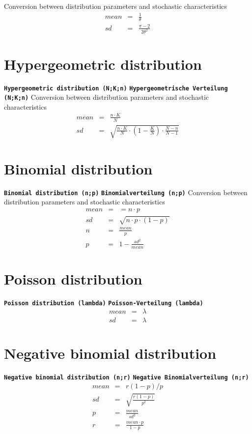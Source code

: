\documentclass{svmono}
\def\cm#1{\textbf{\texttt{#1}}}
\begin{document}
Conversion between distribution parameters and stochastic characteristics
\begin{eqnarray*}
mean&=&\frac{1}{\theta}\\
sd&=&\frac{\pi-2}{2\theta^2}
\end{eqnarray*}





\section*{Hypergeometric distribution}
\cm{Hypergeometric distribution (N;K;n)}
\cm{Hypergeometrische Verteilung (N;K;n)}
Conversion between distribution parameters and stochastic characteristics
\begin{eqnarray*}
mean&=&\frac{n\cdot K}{N}\\
sd&=&\sqrt{\frac{n\cdot K}{N}\cdot\left(1-\frac{K}{N}\right)\cdot\frac{N-n}{N-1}}
\end{eqnarray*}





\section*{Binomial distribution}
\cm{Binomial distribution (n;p)}
\cm{Binomialverteilung (n;p)}
Conversion between distribution parameters and stochastic characteristics
\begin{eqnarray*}
mean&=&=n\cdot p\\
sd&=&\sqrt{n\cdot p\cdot (1-p)}\\
n&=&\frac{mean}{p}\\
p&=&1-\frac{sd^2}{mean}
\end{eqnarray*}





\section*{Poisson distribution}
\cm{Poisson distribution (lambda)}
\cm{Poisson-Verteilung (lambda)}
\begin{eqnarray*}
mean&=&\lambda\\
sd&=&\lambda
\end{eqnarray*}





\section*{Negative binomial distribution}
\cm{Negative binomial distribution (n;r)}
\cm{Negative Binomialverteilung (n;r)}
\begin{eqnarray*}
mean&=&r(1-p)/p\\
sd&=&\sqrt{\frac{r(1-p)}{p^2}}\\
p&=&\frac{mean}{sd^2}\\
r&=&\frac{mean\cdot p}{1-p}
\end{eqnarray*}
\end{document}
